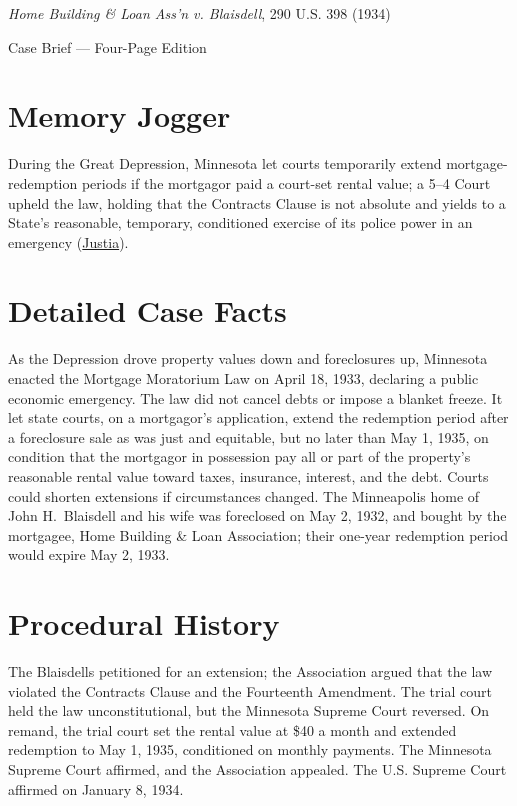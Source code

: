 \documentclass[12pt]{article}
\begin{document}
\begin{center}
{\LARGE \textit{Home Building \& Loan Ass'n v. Blaisdell}, 290 U.S. 398 (1934)\par}
\vspace{0.8em}
{\large Case Brief --- Four-Page Edition\par}
\end{center}
\vspace{1em}

\section{Memory Jogger}

During the Great Depression, Minnesota let courts temporarily extend mortgage-redemption periods if the mortgagor paid a court-set rental value; a 5--4 Court upheld the law, holding that the Contracts Clause is not absolute and yields to a State's reasonable, temporary, conditioned exercise of its police power in an emergency (\href{https://supreme.justia.com/cases/federal/us/290/398/}{Justia}).

\section{Detailed Case Facts}

As the Depression drove property values down and foreclosures up, Minnesota enacted the Mortgage Moratorium Law on April 18, 1933, declaring a public economic emergency. The law did not cancel debts or impose a blanket freeze. It let state courts, on a mortgagor's application, extend the redemption period after a foreclosure sale as was just and equitable, but no later than May 1, 1935, on condition that the mortgagor in possession pay all or part of the property's reasonable rental value toward taxes, insurance, interest, and the debt. Courts could shorten extensions if circumstances changed. The Minneapolis home of John H.\ Blaisdell and his wife was foreclosed on May 2, 1932, and bought by the mortgagee, Home Building \& Loan Association; their one-year redemption period would expire May 2, 1933.

\section{Procedural History}

The Blaisdells petitioned for an extension; the Association argued that the law violated the Contracts Clause and the Fourteenth Amendment. The trial court held the law unconstitutional, but the Minnesota Supreme Court reversed. On remand, the trial court set the rental value at \$40 a month and extended redemption to May 1, 1935, conditioned on monthly payments. The Minnesota Supreme Court affirmed, and the Association appealed. The U.S. Supreme Court affirmed on January 8, 1934.
\end{document}
